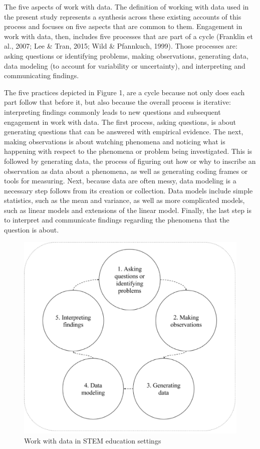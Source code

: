 \documentclass[]{book}
\theoremstyle{definition}
\theoremstyle{definition}
\theoremstyle{definition}
\theoremstyle{remark}
\begin{document}
The five aspects of work with data. The definition of working with data
used in the present study represents a synthesis across these existing
accounts of this process and focuses on five aspects that are common to
them. Engagement in work with data, then, includes five processes that
are part of a cycle (Franklin et al., 2007; Lee \& Tran, 2015; Wild \&
Pfannkuch, 1999). Those processes are: asking questions or identifying
problems, making observations, generating data, data modeling (to
account for variability or uncertainty), and interpreting and
communicating findings.

The five practices depicted in Figure 1, are a cycle because not only
does each part follow that before it, but also because the overall
process is iterative: interpreting findings commonly leads to new
questions and subsequent engagement in work with data. The first
process, asking questions, is about generating questions that can be
answered with empirical evidence. The next, making observations is about
watching phenomena and noticing what is happening with respect to the
phenomena or problem being investigated. This is followed by generating
data, the process of figuring out how or why to inscribe an observation
as data about a phenomena, as well as generating coding frames or tools
for measuring. Next, because data are often messy, data modeling is a
necessary step follows from its creation or collection. Data models
include simple statistics, such as the mean and variance, as well as
more complicated models, such as linear models and extensions of the
linear model. Finally, the last step is to interpret and communicate
findings regarding the phenomena that the question is about.

\begin{figure}

{\centering \includegraphics[width=0.8\linewidth]{images/figure1} 

}

\caption{Work with data in STEM education settings}\label{fig:unnamed-chunk-1}
\end{figure}
\end{document}
